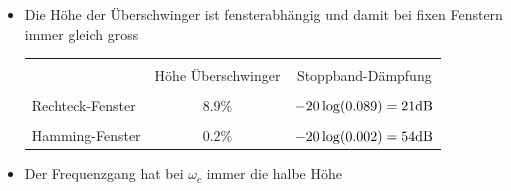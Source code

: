 \begin{itemize}
		 \item Die Höhe der Überschwinger ist fensterabhängig und damit bei fixen Fenstern immer gleich gross\\[0.1cm]
		 \begin{tabular}{|l|c|c|}
		  \hline&&\\[-0.35cm]
			& Höhe Überschwinger & Stoppband-Dämpfung\\[0.05cm]
		  \hline&&\\[-0.35cm]
			Rechteck-Fenster & $8.9\%$ & $-20\log(0.089) =21\text{dB}$\\[0.05cm]
		  \hline&&\\[-0.35cm]
			Hamming-Fenster & $0.2\%$& $-20\log(0.002)= 54\text{dB}$\\[0.05cm]
		  \hline
		 \end{tabular}
		 \item Der Frequenzgang hat bei $\omega_c$ immer die halbe Höhe$\qquad$
		\end{itemize}	
		
